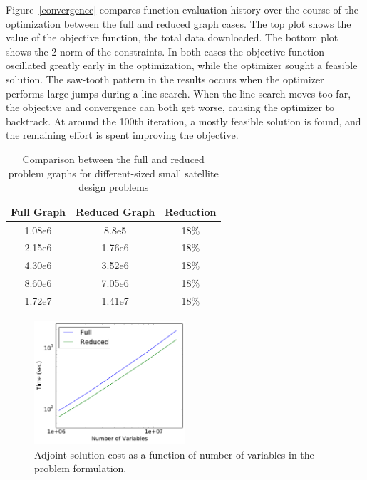 \documentclass[]{aiaa-tc} %
\begin{document}
            Figure~\ref{convergence} compares function evaluation history over the course of
            the optimization between the full and reduced graph cases. The top plot shows the value of the objective function, the total data downloaded.
            The bottom plot shows the 2-norm of the constraints. In both cases the objective function oscillated greatly early in the optimization, while
            the optimizer sought a feasible solution. The saw-tooth pattern in the results occurs when the optimizer performs large
            jumps during a line search. When the line search moves too far, the objective and convergence can both get worse, causing the
            optimizer to backtrack. At around the 100th iteration, a mostly feasible solution is found, and
            the remaining effort is spent improving the objective.

            \begin{table}
              \centering
              \caption{Comparison between the full and reduced problem graphs for different-sized small satellite design problems}
                \begin{tabular}{c c c}
                    \toprule
                    Full Graph & Reduced Graph & Reduction\\
                    \midrule
                    1.08e6 & 8.8e5 &  18\%\\
                    2.15e6 & 1.76e6 & 18\%\\
                    4.30e6 & 3.52e6 & 18\%\\
                    8.60e6 & 7.05e6 & 18\%\\
                    1.72e7 & 1.41e7 & 18\%\\
                    \bottomrule
                \end{tabular}
                \label{tab:cadre-problem-sizes}
            \end{table}


            \begin{figure}[!htbp]
                \centering
                \includegraphics[width=0.5\textwidth]{images/cadre_var_scaling}
                \caption{Adjoint solution cost as a function of number of variables in the problem formulation.}
                \label{fig:cadre-compute-cost}
            \end{figure}
\end{document}
